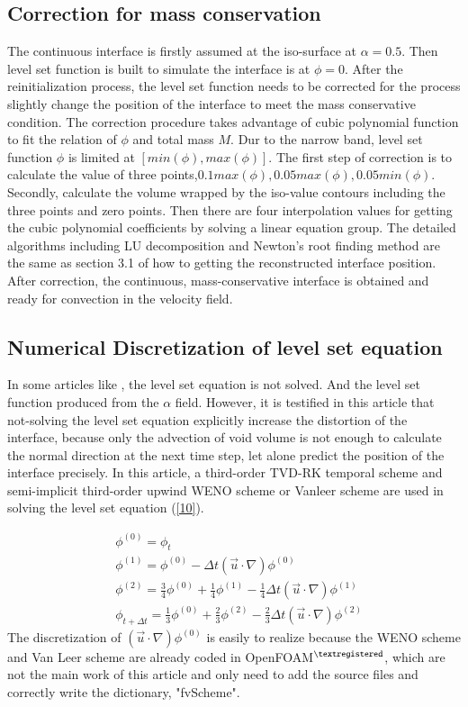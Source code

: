 \subsection{Correction for mass conservation}
The continuous interface is firstly assumed at the iso-surface at $\alpha=0.5$. Then level set function is built to simulate the interface is at $\phi=0$. After the reinitialization process, the level set function needs to be corrected for the process slightly change the position of the interface to meet the mass conservative condition. The correction procedure takes advantage of cubic polynomial function to fit the relation of $\phi$ and total mass $M$. Dur to the narrow band, level set function $\phi$ is limited at $[min(\phi),max(\phi)]$. The first step of correction is to calculate the value of three points,$0.1max(\phi),0.05max(\phi),0.05min(\phi)$. Secondly, calculate the volume wrapped by the iso-value contours including the three points and zero points. Then there are four interpolation values for getting the cubic polynomial coefficients by solving a linear equation group. The detailed algorithms including LU decomposition and Newton's root finding method are the same as section 3.1 of how to getting the reconstructed interface position. After correction, the continuous, mass-conservative interface is obtained and ready for convection in the velocity field. 

\subsection{Numerical Discretization of level set equation}
In some articles like \cite{sun2010coupled,WANG201370}, the level set equation is not solved. And the level set function produced from the $\alpha$ field. However, it is testified in this article that not-solving the level set equation explicitly increase the distortion of the interface, because only the advection of void volume is not enough to calculate the normal direction at the next time step, let alone predict the position of the interface precisely. In this article, a third-order TVD-RK temporal scheme and semi-implicit third-order upwind WENO scheme or Vanleer scheme are used in solving the level set equation (\ref{10}).

\begin{equation}\label{26}
\begin{split}
&\phi^{(0)}=\phi_t\\
&\phi^{(1)}=\phi^{(0)}-\Delta{t}(\vec{u}\cdot\nabla)\phi^{(0)}\\
&\phi^{(2)}=\frac{3}{4}\phi^{(0)}+\frac{1}{4}\phi^{(1)}-\frac{1}{4}\Delta{t}(\vec{u}\cdot\nabla)\phi^{(1)}\\
&\phi_{t+\Delta{t}}=\frac{1}{3}\phi^{(0)}+\frac{2}{3}\phi^{(2)}-\frac{2}{3}\Delta{t}(\vec{u}\cdot\nabla)\phi^{(2)}
\end{split}
\end{equation}
The discretization of $(\vec{u}\cdot\nabla)\phi^{(0)}$ is easily to realize because the WENO scheme and Van Leer scheme are already coded in OpenFOAM$^{\textregistered}$, which are not the main work of this article and only need to add the source files and correctly write the dictionary, "fvScheme". 